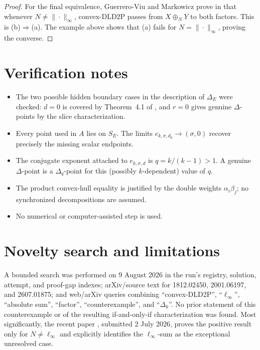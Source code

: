 \documentclass[11pt]{article}
\begin{document}
\begin{proof}
For the final equivalence, Guerrero-Viu and Markowicz prove in
\cite[Proposition~2]{GM} that whenever $N\neq\|\cdot\|_\infty$, convex-DLD2P
passes from $X\oplus_NY$ to both factors.  This is (b)$\Rightarrow$(a).
The example above shows that (a) fails for $N=\|\cdot\|_\infty$, proving the
converse.
\end{proof}

\section{Verification notes}

\begin{itemize}
\item The two possible hidden boundary cases in the description of
      $\Delta_E$ were checked: $d=0$ is covered by Theorem~4.1 of \cite{HPV},
      and $r=0$ gives genuine $\Delta$-points by the slice characterization.
\item Every point used in $A$ lies on $S_E$.  The limits
      $e_{k,\sigma,d_0}\to(\sigma,0)$ recover precisely the missing scalar
      endpoints.
\item The conjugate exponent attached to $e_{k,\sigma,d}$ is
      $q=k/(k-1)>1$.  A genuine $\Delta$-point is a $\Delta_q$-point for this
      (possibly $k$-dependent) value of $q$.
\item The product convex-hull equality is justified by the double weights
      $\alpha_i\beta_j$; no synchronized decompositions are assumed.
\item No numerical or computer-assisted step is used.
\end{itemize}

\section{Novelty search and limitations}

A bounded search was performed on 9 August 2026 in the run's registry,
solution, attempt, and proof-gap indexes; arXiv/source text for 1812.02450,
2001.06197, and 2607.01875; and web/arXiv queries combining
``convex-DLD2P'', ``$\ell_\infty$'', ``absolute sum'', ``factor'',
``counterexample'', and ``$\Delta_k$''.  No prior statement of this
counterexample or of the resulting if-and-only-if characterization was found.
Most significantly, the recent paper \cite{GM}, submitted 2 July 2026, proves
the positive result only for $N\neq\ell_\infty$ and explicitly identifies the
$\ell_\infty$-sum as the exceptional unresolved case.
\end{document}
